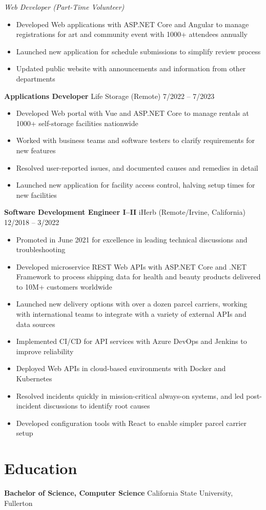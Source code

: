 \documentclass[12pt]{article}
\newcommand{\primaryheader}[4]{\textbf{#1} \symbol{"B7} #3 (#4) \hfill #2}
\newcommand{\secondaryheader}[2]{\begin{adjustwidth}{0.25in}{}\textit{#1} \hfill #2\end{adjustwidth}}
\begin{document}
	\secondaryheader{Web Developer (Part-Time Volunteer)}{}

	\begin{itemize}
		\item Developed Web applications with ASP.NET Core and Angular to manage registrations for art and community event with 1000+ attendees annually
		\item Launched new application for schedule submissions to simplify review process
		\item Updated public website with announcements and information from other departments
	\end{itemize}

	\primaryheader{Applications Developer}{7/2022 -- 7/2023}{Life Storage}{Remote}

	\begin{itemize}
		\item Developed Web portal with Vue and ASP.NET Core to manage rentals at 1000+ self-storage facilities nationwide
		\item Worked with business teams and software testers to clarify requirements for new features
		\item Resolved user-reported issues, and documented causes and remedies in detail
		\item Launched new application for facility access control, halving setup times for new facilities
	\end{itemize}

	\primaryheader{Software Development Engineer I--II}{12/2018 -- 3/2022}{iHerb}{Remote/Irvine, California}

	\begin{itemize}
		\item Promoted in June 2021 for excellence in leading technical discussions and troubleshooting
		\item Developed microservice REST Web APIs with ASP.NET Core and .NET Framework to process shipping data for health and beauty products delivered to 10M+ customers worldwide
		\item Launched new delivery options with over a dozen parcel carriers, working with international teams to integrate with a variety of external APIs and data sources
		\item Implemented CI/CD for API services with Azure DevOps and Jenkins to improve reliability
		\item Deployed Web APIs in cloud-based environments with Docker and Kubernetes
		\item Resolved incidents quickly in mission-critical always-on systems, and led post-incident discussions to identify root causes
		\item Developed configuration tools with React to enable simpler parcel carrier setup
	\end{itemize}

	\section*{Education}

	\textbf{Bachelor of Science, Computer Science}  California State University, Fullerton
\end{document}
